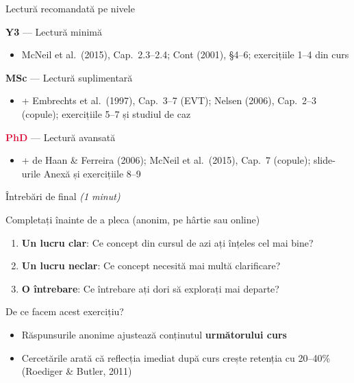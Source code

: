 \documentclass[9pt, aspectratio=169, t]{beamer}
\theoremstyle{definition}
\begin{document}
\begin{frame}{Lectură recomandată pe nivele}
\begin{block}{\textcolor{Forest}{\textbf{Y3}} --- Lectură minimă}
\begin{itemize}\setlength\itemsep{0pt}
\item McNeil et al.\ (2015), Cap.\ 2.3--2.4; Cont (2001), \S4--6; exercițiile 1--4 din curs
\end{itemize}
\end{block}
\begin{block}{\textcolor{MainBlue}{\textbf{MSc}} --- Lectură suplimentară}
\begin{itemize}\setlength\itemsep{0pt}
\item + Embrechts et al.\ (1997), Cap.\ 3--7 (EVT); Nelsen (2006), Cap.\ 2--3 (copule); exercițiile 5--7 și studiul de caz
\end{itemize}
\end{block}
\begin{block}{\textcolor{Crimson}{\textbf{PhD}} --- Lectură avansată}
\begin{itemize}\setlength\itemsep{0pt}
\item + de Haan \& Ferreira (2006); McNeil et al.\ (2015), Cap.\ 7 (copule); slide-urile Anexă și exercițiile 8--9
\end{itemize}
\end{block}
\end{frame}

\begin{frame}{Întrebări de final \hfill {\normalsize\textcolor{MediumGray}{\textit{(1 minut)}}}}
\begin{alertblock}{Completați înainte de a pleca (anonim, pe hârtie sau online)}
\begin{enumerate}\setlength\itemsep{6pt}
\item \textbf{Un lucru clar}: Ce concept din cursul de azi ați înțeles cel mai bine?
\item \textbf{Un lucru neclar}: Ce concept necesită mai multă clarificare?
\item \textbf{O întrebare}: Ce întrebare ați dori să explorați mai departe?
\end{enumerate}
\end{alertblock}
\vspace{0.3cm}
\begin{block}{De ce facem acest exercițiu?}
\begin{itemize}\setlength\itemsep{2pt}
\item Răspunsurile anonime ajustează conținutul \textbf{următorului curs}
\item Cercetările arată că reflecția imediat după curs crește retenția cu 20--40\% (Roediger \& Butler, 2011)
\end{itemize}
\end{block}
\end{frame}
\end{document}

